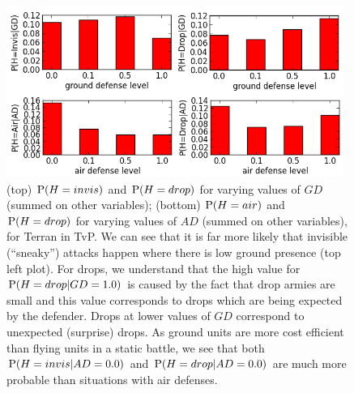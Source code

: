 \begin{figure}[htp]
\centerline{\includegraphics[width=11cm]{images/Terran_Prob_H_crop.png}}
\caption{(top) $\mathrm{P}(H=invis)$ and $\mathrm{P}(H=drop)$ for varying values of $GD$ (summed on other variables); (bottom) $\mathrm{P}(H=air)$ and $\mathrm{P}(H=drop)$ for varying values of $AD$ (summed on other variables), for Terran in TvP. We can see that it is far more likely that invisible (``sneaky'') attacks happen where there is low ground presence (top left plot). For drops, we understand that the high value for $\mathrm{P}(H=drop|GD=1.0)$ is caused by the fact that drop armies are small and this value corresponds to drops which are being expected by the defender. Drops at lower values of $GD$ correspond to unexpected (surprise) drops. As ground units are more cost efficient than flying units in a static battle, we see that both $\mathrm{P}(H=invis|AD=0.0)$ and $\mathrm{P}(H=drop|AD=0.0)$ are much more probable than situations with air defenses.}
\label{fig:P_H_AD}
\end{figure}

